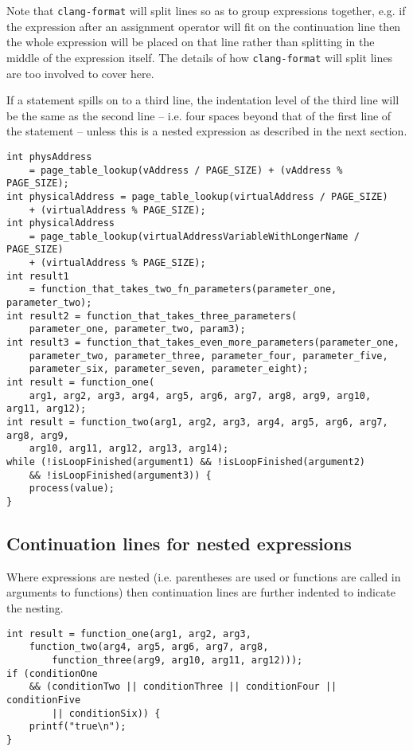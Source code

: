 \documentclass{article}
\begin{document}
Note that \texttt{clang-format} will split lines so as to group expressions together, e.g. if the expression after an assignment operator will fit on the continuation line then the whole expression will be placed on that line rather than splitting in the 
middle of the expression itself. The details of how \texttt{clang-format} will split lines are too involved to cover here.

If a statement spills on to a third line, the indentation 
level of the third line will be the same as the second line -- i.e. four spaces beyond that of the first line of 
the statement -- unless this is a nested expression as described in the next section.

\nolinenumbers
{}
\begin{lstlisting}
int physAddress
    = page_table_lookup(vAddress / PAGE_SIZE) + (vAddress % PAGE_SIZE);
int physicalAddress = page_table_lookup(virtualAddress / PAGE_SIZE)
    + (virtualAddress % PAGE_SIZE);
int physicalAddress
    = page_table_lookup(virtualAddressVariableWithLongerName / PAGE_SIZE)
    + (virtualAddress % PAGE_SIZE);
int result1
    = function_that_takes_two_fn_parameters(parameter_one, parameter_two);
int result2 = function_that_takes_three_parameters(
    parameter_one, parameter_two, param3);
int result3 = function_that_takes_even_more_parameters(parameter_one,
    parameter_two, parameter_three, parameter_four, parameter_five,
    parameter_six, parameter_seven, parameter_eight);
int result = function_one(
    arg1, arg2, arg3, arg4, arg5, arg6, arg7, arg8, arg9, arg10, arg11, arg12);
int result = function_two(arg1, arg2, arg3, arg4, arg5, arg6, arg7, arg8, arg9,
    arg10, arg11, arg12, arg13, arg14);
while (!isLoopFinished(argument1) && !isLoopFinished(argument2)
    && !isLoopFinished(argument3)) {
    process(value);
}
\end{lstlisting}
\linenumbers

\subsection{Continuation lines for nested expressions}

Where expressions are nested (i.e. parentheses are used or functions are called in arguments to functions)
then continuation lines are further indented to indicate the nesting. 

\nolinenumbers
{}
\begin{lstlisting}
int result = function_one(arg1, arg2, arg3,
    function_two(arg4, arg5, arg6, arg7, arg8,
        function_three(arg9, arg10, arg11, arg12)));
if (conditionOne
    && (conditionTwo || conditionThree || conditionFour || conditionFive
        || conditionSix)) {
    printf("true\n");
}
\end{lstlisting}
\linenumbers
\end{document}
